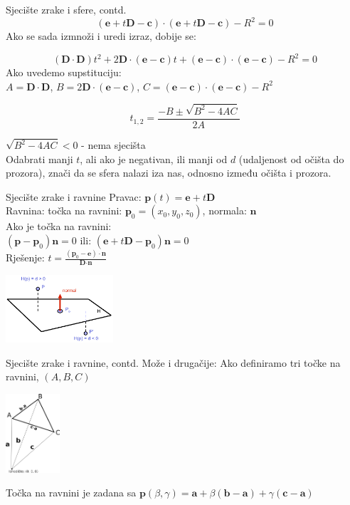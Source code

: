 \documentclass[9pt]{beamer}
\begin{document}
\begin{frame}{Sjecište zrake i sfere, contd.}
$$(\textbf{e} + t\textbf{D}-\textbf{c})\cdot (\textbf{e} + t\textbf{D}-\textbf{c}) - R^2 = 0$$
Ako se sada izmnoži i uredi izraz, dobije se:

$$(\textbf{D}\cdot \textbf{D})t^2+2\textbf{D}\cdot(\textbf{e}-\textbf{c})t + (\textbf{e}-\textbf{c})\cdot(\textbf{e}-\textbf{c}) - R^2=0$$
Ako uvedemo supstituciju:\\
$A = \textbf{D}\cdot \textbf{D}$, $B = 2\textbf{D}\cdot(\textbf{e}-\textbf{c})$, $C = (\textbf{e}-\textbf{c})\cdot(\textbf{e}-\textbf{c}) - R^2$

$$t_{1,2} = \frac{-B \pm \sqrt{B^2-4AC}}{2A}$$

$\sqrt{B^2-4AC} < 0$ - nema sjecišta \\
Odabrati manji $t$, ali ako je negativan, ili manji od $d$ (udaljenost od očišta do prozora), znači da se sfera nalazi iza nas, odnosno između očišta i prozora.
\end{frame}	

\begin{frame}{Sjecište zrake i ravnine}
Pravac: $\textbf{p}(t) = \textbf{e}+t\textbf{D}$
\\Ravnina: točka na ravnini: $\textbf{p}_0 = (x_0, y_0, z_0)$, normala: $\textbf{n}$
\\Ako je točka na ravnini:\\
$(\textbf{p} - \textbf{p}_0)\textbf{n}=0$
ili:
$(\textbf{e} +t\textbf{D}- \textbf{p}_0)\textbf{n}=0$
\\Rješenje: $t = \frac{(\textbf{p}_0-\textbf{e})\cdot\textbf{n}}{\textbf{D}\cdot\textbf{n}}$

\begin{center}
\includegraphics[width=4cm]{slike/ray_ravnina.png}
\end{center}
\end{frame}	

\begin{frame}{Sjecište zrake i ravnine, contd.}
Može i drugačije: Ako definiramo tri točke na ravnini, $(A, B, C)$ 
\begin{center}
\includegraphics[width=2cm]{slike/ravnina_vector.png}
\end{center}
Točka na ravnini je zadana sa 
$\textbf{p}(\beta, \gamma) = \textbf{a} + \beta(\textbf{b}-\textbf{a}) + \gamma(\textbf{c}-\textbf{a})$
\end{frame}	
\end{document}

